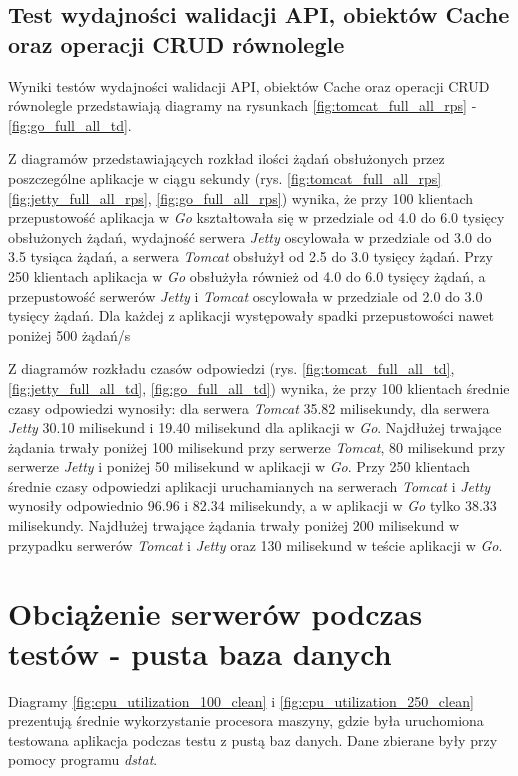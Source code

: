 
\clearpage

\subsection{Test wydajności walidacji API, obiektów Cache oraz operacji CRUD równolegle}

Wyniki testów wydajności walidacji API, obiektów Cache oraz operacji CRUD równolegle przedstawiają diagramy na rysunkach \ref{fig:tomcat_full_all_rps} - \ref{fig:go_full_all_td}.              

Z diagramów przedstawiających rozkład ilości żądań obsłużonych przez poszczególne aplikacje w ciągu sekundy  (rys. \ref{fig:tomcat_full_all_rps} \ref{fig:jetty_full_all_rps}, \ref{fig:go_full_all_rps}) wynika, że przy 100 klientach przepustowość aplikacja w \textsl{Go} kształtowała się w przedziale od 4.0 do 6.0 tysięcy obsłużonych żądań, wydajność serwera \textsl{Jetty} oscylowała w przedziale od 3.0 do 3.5 tysiąca  żądań, a  serwera \textsl{Tomcat}  obsłużył od 2.5 do 3.0 tysięcy żądań. Przy 250 klientach aplikacja w \textsl{Go} obsłużyła również od 4.0 do 6.0 tysięcy żądań, a przepustowość serwerów \textsl{Jetty} i \textsl{Tomcat} oscylowała w przedziale od 2.0 do 3.0 tysięcy żądań. Dla każdej z aplikacji występowały spadki przepustowości nawet poniżej 500 żądań/s

Z diagramów rozkładu czasów odpowiedzi (rys. \ref{fig:tomcat_full_all_td}, \ref{fig:jetty_full_all_td}, \ref{fig:go_full_all_td}) wynika, że przy 100 klientach średnie czasy odpowiedzi wynosiły: dla serwera \textsl{Tomcat} 35.82 milisekundy, dla serwera \textsl{Jetty} 30.10 milisekund i 19.40 milisekund dla aplikacji w \textsl{Go}. Najdłużej trwające żądania trwały poniżej 100 milisekund przy serwerze \textsl{Tomcat}, 80 milisekund przy serwerze \textsl{Jetty} i  poniżej 50 milisekund  w aplikacji w \textsl{Go}. Przy 250 klientach średnie czasy odpowiedzi aplikacji uruchamianych na serwerach \textsl{Tomcat}  i \textsl{Jetty}   wynosiły odpowiednio 96.96 i 82.34 milisekundy, a w aplikacji w \textsl{Go} tylko 38.33 milisekundy. Najdłużej trwające żądania trwały poniżej 200 milisekund w przypadku serwerów \textsl{Tomcat} i \textsl{Jetty} oraz 130 milisekund w teście aplikacji w \textsl{Go}.


\clearpage

\section{Obciążenie serwerów podczas testów - pusta baza danych}
Diagramy \ref{fig:cpu_utilization_100_clean} i \ref{fig:cpu_utilization_250_clean} prezentują średnie wykorzystanie procesora maszyny, gdzie była uruchomiona testowana aplikacja podczas testu z pustą baz danych. Dane zbierane były przy pomocy programu \textsl{dstat}.

